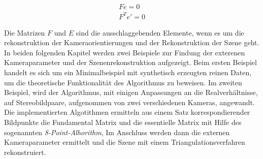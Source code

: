 \begin{gather}
	Fe = 0\\
	F^Te' = 0
\end{gather}

Die Matrizen $F$ und $E$ sind die ausschlaggebenden Elemente, wenn es um die rekonstruktion der Kameraorientierungen und der Rekonstruktion der Szene geht. In beiden folgenden Kapitel werden zwei Beispiele zur Findung der exterenen Kameraparameter und der Szenenrekonstruktion aufgezeigt. Beim ersten Beispiel handelt es sich um ein Minimalbeispiel mit synthetisch erzeugten reinen Daten, um die theoretische Funktionalität des Algorithmus zu beweisen. Im zweiten Beispiel, wird der Algorithmus, mit einigen Anpassungen an die Realverhältnisse, auf Stereobildpaare, aufgenommen von zwei verschiedenen Kameras, angewandt. Die implementierten Algotithmen ermitteln aus einem Satz korrespondierender Bildpunkte die Fundamental Matrix und die essentielle Matrix mit Hilfe des sogenannten \textit{8-Point-Alhorithm}, Im Anschluss werden dann die externen Kameraparameter ermittelt und die Szene mit einem Triangulationsverfahren rekonstruiert. 

